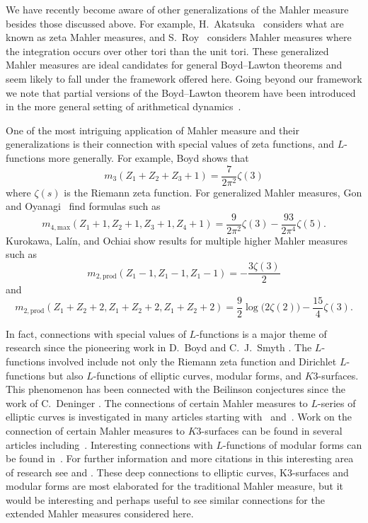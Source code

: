 \documentclass[12pt]{amsart}
\theoremstyle{plain}
\theoremstyle{definition}
\theoremstyle{remark}
\numberwithin{theorem}{section}
\numberwithin{equation}{section} %
\begin{document}
We have recently become aware of other generalizations of the Mahler measure besides
those discussed above.
For example, H.~Akatsuka~\cite{Akatsuka} considers what are known as zeta Mahler measures, and S.~Roy~\cite{Roy} considers Mahler measures where the integration occurs over other tori than the unit tori.
These generalized Mahler measures are ideal candidates for general  Boyd--Lawton theorems
and seem likely to fall under the framework offered here. Going beyond our framework we note
that partial versions of the Boyd--Lawton theorem have 
been introduced in the more general setting of 
arithmetical dynamics~\cite[Proposition~1.3]{twovariablemahlerPublished}. 


One of the most intriguing application of Mahler measure and their generalizations is their connection with special values of 
zeta functions, and $L$-functions more generally.
For example, Boyd \cite{BoydLFunctions} shows that
$$
m_3( Z_1 + Z_2 + Z_3 + 1) = \frac 7{2 \pi^2} \zeta(3)
$$
where $\zeta(s)$ is the Riemann zeta function. 
For generalized Mahler measures, Gon and Oyanagi~\cite{GonOyanagi2004} find formulas such as
$$
m_{4, \mathrm{max}} ( Z_1 + 1, Z_2 + 1, Z_3 + 1, Z_4+1) = \frac 9{2 \pi^2} \zeta(3) - \frac {93}{2\pi^4} \zeta(5).
$$
Kurokawa, Lal\'in, and Ochiai \cite{Kurokawa2008} show results
for
multiple higher Mahler 
measures such as
$$
m_{2, \mathrm{prod}}( Z_1 -1, Z_1-1, Z_1 -1 ) = - \frac {3\zeta(3)}2
$$
and
$$
m_{2, \mathrm{prod}}\left( Z_1 + Z_2 + 2, Z_1 + Z_2 +2, Z_1 + Z_2 + 2\right) = \frac 9 2 \log \big(2 \zeta (2)\big) - \frac  {15} 4 \zeta(3).
$$

In fact, connections with special values of $L$-functions is a major theme of research since the pioneering work in D.~Boyd \cite{BoydSpeculations} and C.~J.~Smyth \cite{Smyth}. The $L$-functions involved include not only the Riemann zeta function and Dirichlet $L$-functions but also $L$-functions of elliptic curves, modular forms, and $K3$-surfaces. This phenomenon has been connected with the Beilinson conjectures since
the work of C.~Deninger \cite{Deninger}.
The connections of certain Mahler measures to $L$-series
of elliptic curves is investigated in many articles starting with~\cite{BoydLFunctions} and~\cite{RVModularMahler}.
Work on the connection of certain Mahler measures to $K3$-surfaces can be found in several articles including~\cite{Bertin2008}.
Interesting connections with $L$-functions of modular forms can be found in~\cite{Samart2013}.
For further information and more citations in this interesting area of research see \cite{BertinLalin} and \cite{Brunault_Zudilin_2020}. 
These deep connections to elliptic curves, K3-surfaces and modular forms are most elaborated for the traditional Mahler measure, but it would be interesting and perhaps useful to see similar connections for the extended Mahler measures considered here.
\end{document}

